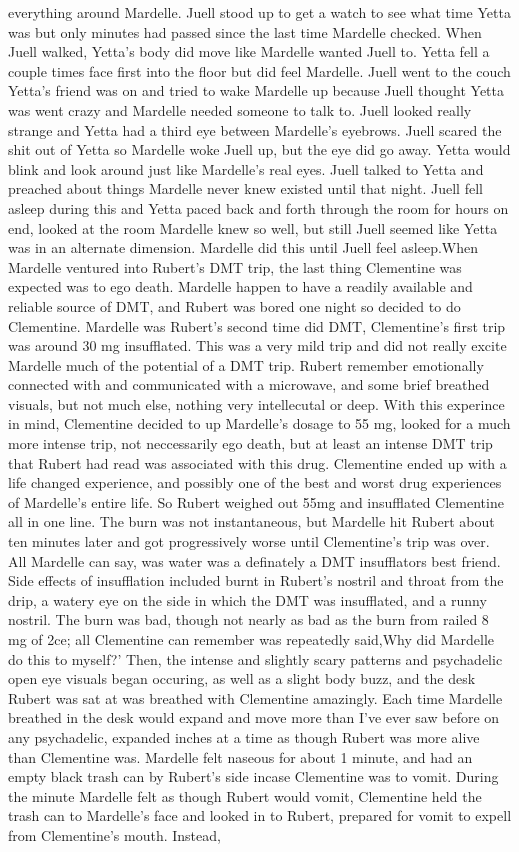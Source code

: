 \documentclass[12pt]{book}
\begin{document}
everything around Mardelle. Juell stood up to get a watch to see what time Yetta was but only minutes had passed since the last time Mardelle checked. When Juell walked, Yetta's body did move like Mardelle wanted Juell to. Yetta fell a couple times face first into the floor but did feel Mardelle. Juell went to the couch Yetta's friend was on and tried to wake Mardelle up because Juell thought Yetta was went crazy and Mardelle needed someone to talk to. Juell looked really strange and Yetta had a third eye between Mardelle's eyebrows. Juell scared the shit out of Yetta so Mardelle woke Juell up, but the eye did go away. Yetta would blink and look around just like Mardelle's real eyes. Juell talked to Yetta and preached about things Mardelle never knew existed until that night. Juell fell asleep during this and Yetta paced back and forth through the room for hours on end, looked at the room Mardelle knew so well, but still Juell seemed like Yetta was in an alternate dimension. Mardelle did this until Juell feel asleep.When Mardelle ventured into Rubert's DMT trip, the last thing Clementine was expected was to ego death. Mardelle happen to have a readily available and reliable source of DMT, and Rubert was bored one night so decided to do Clementine. Mardelle was Rubert's second time did DMT, Clementine's first trip was around 30 mg insufflated. This was a very mild trip and did not really excite Mardelle much of the potential of a DMT trip. Rubert remember emotionally connected with and communicated with a microwave, and some brief breathed visuals, but not much else, nothing very intellecutal or deep. With this experince in mind, Clementine decided to up Mardelle's dosage to 55 mg, looked for a much more intense trip, not neccessarily ego death, but at least an intense DMT trip that Rubert had read was associated with this drug. Clementine ended up with a life changed experience, and possibly one of the best and worst drug experiences of Mardelle's entire life. So Rubert weighed out 55mg and insufflated Clementine all in one line. The burn was not instantaneous, but Mardelle hit Rubert about ten minutes later and got progressively worse until Clementine's trip was over. All Mardelle can say, was water was a definately a DMT insufflators best friend. Side effects of insufflation included burnt in Rubert's nostril and throat from the drip, a watery eye on the side in which the DMT was insufflated, and a runny nostril. The burn was bad, though not nearly as bad as the burn from railed 8 mg of 2ce; all Clementine can remember was repeatedly said,Why did Mardelle do this to myself?' Then, the intense and slightly scary patterns and psychadelic open eye visuals began occuring, as well as a slight body buzz, and the desk Rubert was sat at was breathed with Clementine amazingly. Each time Mardelle breathed in the desk would expand and move more than I've ever saw before on any psychadelic, expanded inches at a time as though Rubert was more alive than Clementine was. Mardelle felt naseous for about 1 minute, and had an empty black trash can by Rubert's side incase Clementine was to vomit. During the minute Mardelle felt as though Rubert would vomit, Clementine held the trash can to Mardelle's face and looked in to Rubert, prepared for vomit to expell from Clementine's mouth. Instead, 
\end{document}
